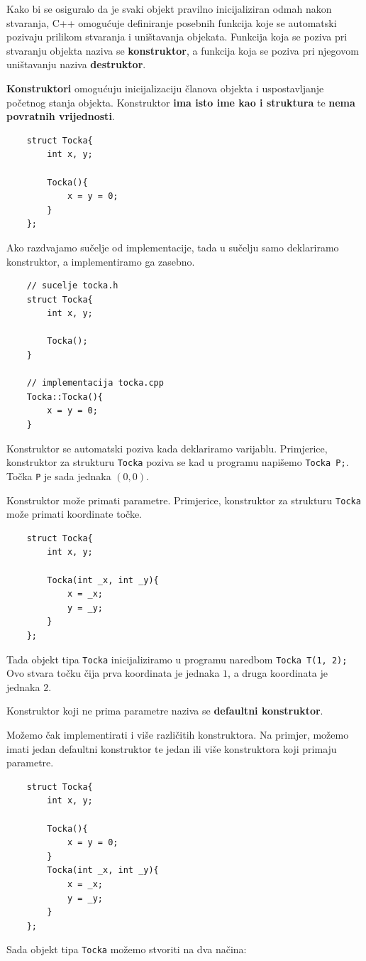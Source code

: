 Kako bi se osiguralo da je svaki objekt pravilno inicijaliziran odmah nakon stvaranja, C++ omogućuje definiranje posebnih funkcija koje se automatski pozivaju prilikom stvaranja i uništavanja objekata. Funkcija koja se poziva pri stvaranju objekta naziva se \textbf{konstruktor}, a funkcija koja se poziva pri njegovom uništavanju naziva \textbf{destruktor}.
\medskip

\textbf{Konstruktori} omogućuju inicijalizaciju članova objekta i uspostavljanje početnog stanja objekta. Konstruktor \textbf{ima isto ime kao i struktura} te \textbf{nema povratnih vrijednosti}.
\begin{verbatim}
    struct Tocka{
        int x, y;

        Tocka(){
            x = y = 0;
        }
    };
\end{verbatim}
Ako razdvajamo sučelje od implementacije, tada u sučelju samo deklariramo konstruktor, a implementiramo ga zasebno. 

\begin{verbatim}
    // sucelje tocka.h
    struct Tocka{
        int x, y;

        Tocka();
    }

    // implementacija tocka.cpp
    Tocka::Tocka(){
        x = y = 0;
    }
\end{verbatim}
Konstruktor se automatski poziva kada deklariramo varijablu. Primjerice, konstruktor za strukturu \texttt{Tocka} poziva se kad u programu napišemo \texttt{Tocka P;}. Točka \texttt{P} je sada jednaka $(0,0)$.

Konstruktor može primati parametre. Primjerice, konstruktor za strukturu \texttt{Tocka} može primati koordinate točke.
\begin{verbatim}
    struct Tocka{
        int x, y;

        Tocka(int _x, int _y){
            x = _x;
            y = _y;
        }
    };
\end{verbatim}
Tada objekt tipa \texttt{Tocka} inicijaliziramo u programu naredbom \texttt{Tocka T(1, 2);} Ovo stvara točku čija prva koordinata je jednaka $1$, a druga koordinata je jednaka $2$.

Konstruktor koji ne prima parametre naziva se \textbf{defaultni konstruktor}.

Možemo čak implementirati i više različitih konstruktora. Na primjer, možemo imati jedan defaultni konstruktor te jedan ili više konstruktora koji primaju parametre.
\begin{verbatim}
    struct Tocka{
        int x, y;

        Tocka(){
            x = y = 0;
        }
        Tocka(int _x, int _y){
            x = _x;
            y = _y;
        }
    };
\end{verbatim}
Sada objekt tipa \texttt{Tocka} možemo stvoriti na dva načina:

